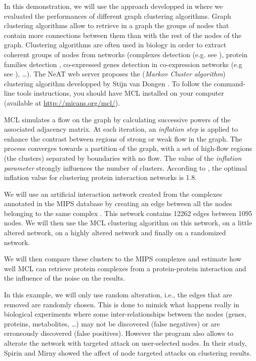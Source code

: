 In this demonstration, we will use the approach developped in \cite{Brohee2006} where we evaluated the performances of different graph clustering algorithms. Graph clustering algorithms allow to retrieve in a graph the groups of nodes that contain more connections between them than with the rest of the nodes of the graph. Clustering algorithms are often used in biology in order to extract coherent groups of nodes from networks (complexes detection (e.g. see \cite{Sharan2007,Krogan2006,Brohee2006,Pereira-Leal2004}), protein families detection \cite{Enright2002}, co-expressed genes detection in co-expression networks (e.g see \cite{Lattimore2005}), \ldots). The NeAT web server proposes the  (\textit{Markov Cluster algorithm}) clustering algorithm developped by Stijn van Dongen \cite{VanDongenPHD2000,Enright2002}. To follow the command-line tools instructions, you should have  MCL installed on your computer (available at \url{http://micans.org/mcl/}).

MCL simulates a flow on the graph by
calculating successive powers of the associated adjacency matrix. At
each iteration, an \textit{inflation step} is applied to enhance the
contrast between regions of strong or weak flow in the graph. The
process converges towards a partition of the graph, with a set of 
high-flow regions (the clusters) separated by boundaries with no 
flow. The value of the \textit{inflation parameter} strongly 
influences the number of clusters. According to \cite{Brohee2006}, the optimal inflation
value for clustering protein interaction networks is 1.8.

We will use an artificial interaction network created from the complexes annotated in the MIPS database by creating an edge between all the nodes belonging to the same complex \cite{Mewes2007}. This network contains 12262 edges between 1095 nodes. We will then use the MCL clustering algorithm on this network, on a little altered network, on a highly altered network and finally on a randomized network. 

We will then compare these clusters to the MIPS complexes and estimate how well MCL can retrieve protein complexes from a protein-protein interaction and the influence of the noise on the results.

In this example, we will only use random alteration, i.e., the edges that are removed are randomly chosen. This is done to mimick what happens really in biological experiments where some inter-relationships between the nodes (genes, proteins, metabolites, \ldots) may not be discovered (false negatives) or are erroneously discovered (false positives). However the  program also allows to alterate the network with targeted attack on user-selected nodes. In their study, Spirin and Mirny \cite{Spirin2003} showed the affect of node targeted attacks on clustering results.

